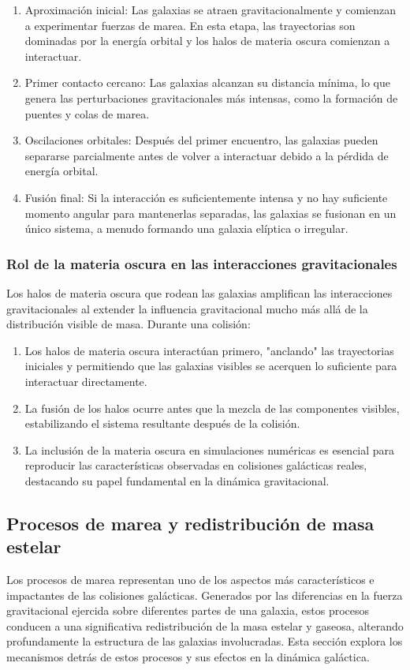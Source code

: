 \documentclass{article}
\begin{document}
\begin{enumerate}
    \item Aproximación inicial: Las galaxias se atraen gravitacionalmente y comienzan a experimentar fuerzas de marea. En esta etapa, las trayectorias son dominadas por la energía orbital y los halos de materia oscura comienzan a interactuar.
    \item Primer contacto cercano: Las galaxias alcanzan su distancia mínima, lo que genera las perturbaciones gravitacionales más intensas, como la formación de puentes y colas de marea.
    \item Oscilaciones orbitales: Después del primer encuentro, las galaxias pueden separarse parcialmente antes de volver a interactuar debido a la pérdida de energía orbital.
    \item Fusión final: Si la interacción es suficientemente intensa y no hay suficiente momento angular para mantenerlas separadas, las galaxias se fusionan en un único sistema, a menudo formando una galaxia elíptica o irregular.
\end{enumerate}

\subsubsection{Rol de la materia oscura en las interacciones gravitacionales}
Los halos de materia oscura que rodean las galaxias amplifican las interacciones gravitacionales al extender la influencia gravitacional mucho más allá de la distribución visible de masa. Durante una colisión:

\begin{enumerate}
    \item Los halos de materia oscura interactúan primero, "anclando" las trayectorias iniciales y permitiendo que las galaxias visibles se acerquen lo suficiente para interactuar directamente.
    \item La fusión de los halos ocurre antes que la mezcla de las componentes visibles, estabilizando el sistema resultante después de la colisión.
    \item La inclusión de la materia oscura en simulaciones numéricas es esencial para reproducir las características observadas en colisiones galácticas reales, destacando su papel fundamental en la dinámica gravitacional.
\end{enumerate}

\subsection{Procesos de marea y redistribución de masa estelar}
Los procesos de marea representan uno de los aspectos más característicos e impactantes de las colisiones galácticas. Generados por las diferencias en la fuerza gravitacional ejercida sobre diferentes partes de una galaxia, estos procesos conducen a una significativa redistribución de la masa estelar y gaseosa, alterando profundamente la estructura de las galaxias involucradas. Esta sección explora los mecanismos detrás de estos procesos y sus efectos en la dinámica galáctica.
\end{document}
